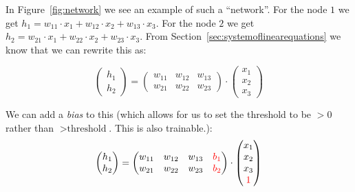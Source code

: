 In Figure~\ref{fig:network} we see an example of such a ``network''. For the node $1$ we get $h_{1} = w_{11} \cdot x_{1} + w_{12} \cdot x_{2} + w_{13} \cdot x_{3}$. For the node $2$ we get $h_{2} = w_{21} \cdot x_{1} + w_{22} \cdot x_{2} +  w_{23} \cdot x_{3}$. From Section~\ref{sec:systemoflinearequations} we know that we can rewrite this as:

\begin{equation*}
	\begin{pmatrix}
		h_{1} \\
		h_{2}
	\end{pmatrix} =
	\begin{pmatrix}
		w_{11} & w_{12} & w_{13} \\
		w_{21} & w_{22} & w_{23}
	\end{pmatrix} \cdot \begin{pmatrix}
		x_{1} \\
		x_{2} \\
		x_{3}
	\end{pmatrix}
\end{equation*}

We can add a \textit{bias} to this (which allows for us to set the threshold to be $>0$ rather than $> \text{threshold}$. This is also trainable.):
\begin{equation*}
	\begin{pmatrix}
		h_{1} \\
		h_{2}
	\end{pmatrix} =
	\begin{pmatrix}
		w_{11} & w_{12} & w_{13} & {\color{red} b_{1}} \\
		w_{21} & w_{22} & w_{23} & {\color{red} b_{2}}
	\end{pmatrix} \cdot \begin{pmatrix}
		x_{1} \\
		x_{2} \\
		x_{3} \\
		{\color{red} 1}
	\end{pmatrix}
\end{equation*}


